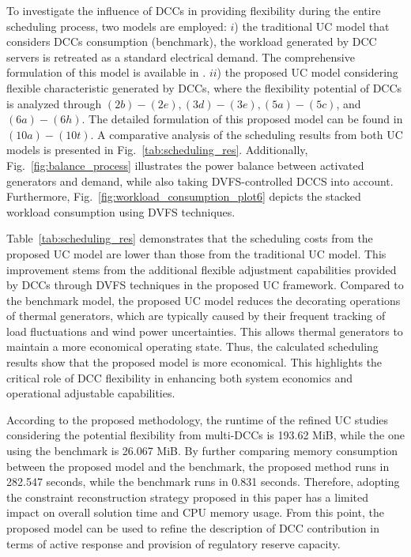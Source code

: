 \documentclass[lettersize,journal]{IEEEtran}
\begin{document}
To investigate the influence of DCCs in providing flexibility during the entire scheduling process, two models are employed:
$i$) the traditional UC model that considers DCCs consumption (benchmark), the workload generated by DCC servers is retreated as a standard electrical demand. The comprehensive formulation of this model is available in \cite{doi:10.1049/icp.2025.0664}.
$ii$) the proposed UC model considering flexible characteristic generated by DCCs, where the flexibility potential of DCCs is analyzed through $(2b)-(2e), (3d)-(3e), (5a)-(5c)$, and $(6a)-(6h)$. The detailed formulation of this proposed model can be found in $(10a)-(10t)$.
A comparative analysis of the scheduling results from both UC models is presented in Fig.~\ref{tab:scheduling_res}. Additionally, Fig.~\ref{fig:balance_process} illustrates the power balance between activated generators and demand, while also taking DVFS-controlled DCCS into account. Furthermore, Fig.~\ref{fig:workload_consumption_plot6} depicts the stacked workload consumption using DVFS techniques.

Table~\ref{tab:scheduling_res} demonstrates that the scheduling costs from the proposed UC model are lower than those from the traditional UC model. This improvement stems from the additional flexible adjustment capabilities provided by DCCs through DVFS techniques in the proposed UC framework. Compared to the benchmark model, the proposed UC model reduces the decorating operations of thermal generators, which are typically caused by their frequent tracking of load fluctuations and wind power uncertainties. This allows thermal generators to maintain a more economical operating state. Thus, the calculated scheduling results show that the proposed model is more economical. This highlights the critical role of DCC flexibility in enhancing both system economics and operational adjustable capabilities.

According to the proposed methodology, the runtime of the refined UC studies considering the potential flexibility from multi-DCCs is 193.62 MiB, while the one using the benchmark is 26.067 MiB. By further comparing memory consumption between the proposed model and the benchmark, the proposed method runs in 282.547 seconds, while the benchmark runs in 0.831 seconds. Therefore, adopting the constraint reconstruction strategy proposed in this paper has a limited impact on overall solution time and CPU memory usage. From this point, the proposed model can be used to refine the description of DCC contribution in terms of active response and provision of regulatory reserve capacity.
\end{document}
